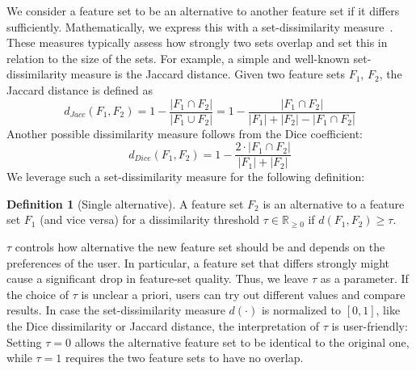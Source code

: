 \documentclass{article}
\theoremstyle{definition}
\newtheorem{definition}{Definition}
\begin{document}
We consider a feature set to be an alternative to another feature set if it differs sufficiently.
Mathematically, we express this with a set-dissimilarity measure~\cite{egghe2009new}.
These measures typically assess how strongly two sets overlap and set this in relation to the size of the sets.
For example, a simple and well-known set-dissimilarity measure is the Jaccard distance.
Given two feature sets $F_1$, $F_2$, the Jaccard distance is defined as
%
\begin{equation}
	d_{Jacc}(F_1,F_2) = 1 - \frac{|F_1 \cap F_2|}{|F_1 \cup F_2|} = 1 - \frac{|F_1 \cap F_2|}{|F_1| + |F_2| - |F_1 \cap F_2|}
	\label{eq:jaccard}
\end{equation}
Another possible dissimilarity measure follows from the Dice coefficient:
%
\begin{equation}
	d_{Dice}(F_1,F_2) = 1 - \frac{2 \cdot |F_1 \cap F_2|}{|F_1| + |F_2|}
	\label{eq:dice}
\end{equation}
%
We leverage such a set-dissimilarity measure for the following definition:
%
\begin{definition}[Single alternative]
	A feature set $F_2$ is an alternative to a feature set $F_1$ (and vice versa) for a dissimilarity threshold $\tau \in \mathbb{R}_{\geq 0}$ if $d(F_1,F_2) \geq \tau$.
	\label{def:single-alternative}
\end{definition}
%
$\tau$ controls how alternative the new feature set should be and depends on the preferences of the user.
In particular, a feature set that differs strongly might cause a significant drop in feature-set quality.
Thus, we leave $\tau$ as a parameter.
If the choice of $\tau$ is unclear a priori, users can try out different values and compare results.
In case the set-dissimilarity measure $d(\cdot)$ is normalized to $[0,1]$, like the Dice dissimilarity or Jaccard distance, the interpretation of $\tau$ is user-friendly:
Setting $\tau=0$ allows the alternative feature set to be identical to the original one, while $\tau=1$ requires the two feature sets to have no overlap.
\end{document}
